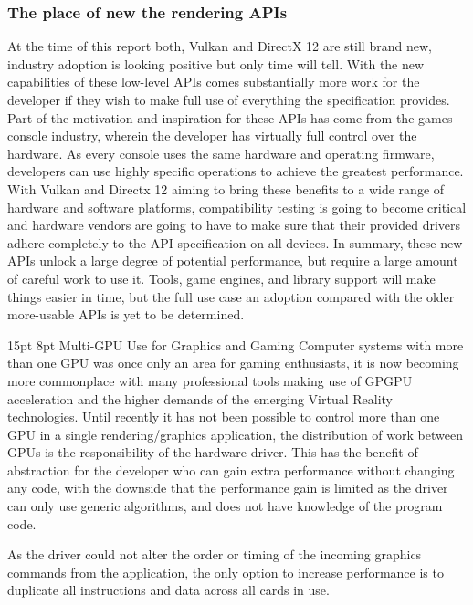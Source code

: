 \documentclass[12pt,a4paper]{article}
\makeatletter
\renewcommand\subsection{\@startsection {subsection}{1}{2mm} %
                               {15pt} %
                               {8pt} %
                               {\fontsize{13pt}{1em}\bfseries}}
\makeatother
\begin{document}
\subsubsection{The place of new the rendering APIs }
At the time of this report both, Vulkan and DirectX 12 are still brand new, industry adoption is looking positive but only time will tell. With the new capabilities of these low-level APIs comes substantially more work for the developer if they wish to make full use of everything the specification provides. Part of the motivation and inspiration for these APIs has come from the games console industry, wherein the developer has virtually full control over the hardware. As every console uses the same hardware and operating firmware, developers can use highly specific operations to achieve the greatest performance. With Vulkan and Directx 12 aiming to bring these benefits to a wide range of hardware and software platforms, compatibility testing is going to become critical and hardware vendors are going to have to make sure that their provided drivers adhere completely to the API specification on all devices. In summary, these new APIs unlock a large degree of potential performance, but require a large amount of careful work to use it. Tools, game engines, and library support will make things easier in time, but the full use case an adoption compared with the older more-usable APIs is yet to be determined. 

\subsection{Multi-GPU Use for Graphics and Gaming}
Computer systems with more than one GPU was once only an area for gaming enthusiasts, it is now becoming more commonplace with many professional tools making use of GPGPU acceleration and the higher demands of the emerging Virtual Reality technologies.  Until recently it has not been possible to control more than one GPU in a single rendering/graphics application, the distribution of work between GPUs is the responsibility of the hardware driver. This has the benefit of abstraction for the developer who can gain extra performance without changing any code, with the downside that the performance gain is limited as the driver can only use generic algorithms, and does not have knowledge of the program code.

As the driver could not alter the order or timing of the incoming graphics commands from the application, the only option to increase performance is to duplicate all instructions and data across all cards in use.
\end{document}
